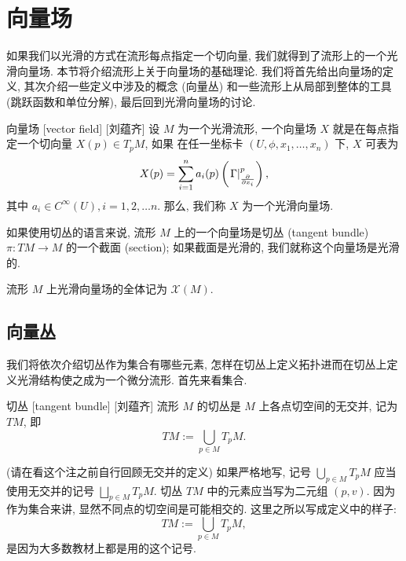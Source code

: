 \documentclass[UTF8]{ctexart}
\begin{document}
\section{向量场}
    
        如果我们以光滑的方式在流形每点指定一个切向量, 我们就得到了流形上的一个光滑向量场. 本节将介绍流形上关于向量场的基础理论. 我们将首先给出向量场的定义, 其次介绍一些定义中涉及的概念 (向量丛) 和一些流形上从局部到整体的工具 (跳跃函数和单位分解), 最后回到光滑向量场的讨论. 

        \begin{dfn}
            []
            {向量场}
            [vector field]
            [刘蕴齐]
            设 \(M\) 为一个光滑流形, 一个向量场 \(X\) 就是在每点指定一个切向量 \(X(p) \in T_p M\), 如果
            在任一坐标卡 \((U,\phi,x_1,\dots,x_n)\) 下,  \(X\)  可表为
            \[
            X(p)=\sum_{i=1}^{n} a_{i}(p)\left(\diff{\frac{\partial}{\partial x_{i}}}{p}{}\right),
            \]
            其中 \(a_i \in C^{\infty}(U), i = 1,2, \dots n\). 那么, 我们称  \(X\)  为一个光滑向量场. 
            
            如果使用切丛的语言来说, 流形 \(M\) 上的一个向量场是切丛 (tangent bundle)  \(\pi: TM \to M\) 的一个截面 (section); 如果截面是光滑的, 我们就称这个向量场是光滑的. 
            
            流形  \(M\)  上光滑向量场的全体记为 \(\mathcal{X}(M)\).
        \end{dfn}
    
    \subsection{向量丛}
    
        我们将依次介绍切丛作为集合有哪些元素, 怎样在切丛上定义拓扑进而在切丛上定义光滑结构使之成为一个微分流形. 首先来看集合. 
        
        \begin{dfn}
            []
            {切丛}
            [tangent bundle]
            [刘蕴齐]
            流形 \(M\) 的切丛是 \(M\) 上各点切空间的无交并, 记为 \(TM\), 即
            \[
                TM:= \displaystyle\bigcup_{p \in M} T_p M.
            \]
        \end{dfn}

        \begin{rmk}
            []
            (请在看这个注之前自行回顾无交并的定义)
            如果严格地写, 记号 \(\displaystyle\bigcup_{p \in M} T_p M\) 应当使用无交并的记号 \(\displaystyle\bigsqcup_{p \in M} T_p M\).  
            切丛 \(T M\) 中的元素应当写为二元组 \((p, v)\). 
            因为作为集合来讲, 显然不同点的切空间是可能相交的. 
            这里之所以写成定义中的样子:
            \[
                TM:= \displaystyle\bigcup_{p \in M} T_p M,
            \]
            是因为大多数教材上都是用的这个记号. 
        \end{rmk}
\end{document}

